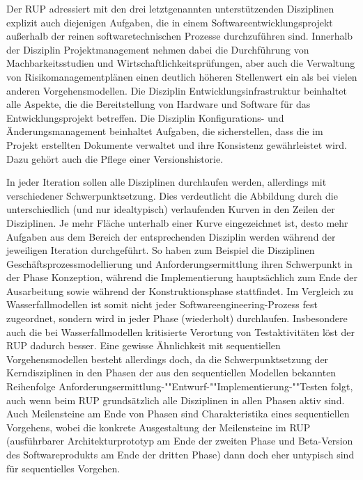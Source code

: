 \vspace{-2mm} %

Der RUP adressiert mit den drei letztgenannten unterstützenden Disziplinen explizit auch diejenigen Aufgaben, die in einem Softwareentwicklungsprojekt außerhalb der reinen softwaretechnischen Prozesse durchzuführen sind. Innerhalb der Disziplin Projektmanagement nehmen dabei die Durchführung von Machbarkeitsstudien und Wirtschaftlichkeitsprüfungen, aber auch die Verwaltung von Risiko\-management\-plänen einen deutlich höheren Stellenwert ein als bei vielen anderen Vorgehensmodellen. Die Disziplin Entwicklungsinfrastruktur beinhaltet alle Aspekte, die die Bereitstellung von Hardware und Software für das Entwicklungsprojekt betreffen. Die Disziplin Konfigurations- und Änderungsmanagement beinhaltet Aufgaben, die sicherstellen, dass die im Projekt erstellten Dokumente verwaltet und ihre Konsistenz gewährleistet wird. Dazu gehört auch die Pflege einer Versionshistorie. 

In jeder Iteration sollen alle Disziplinen durchlaufen werden, allerdings mit verschiedener Schwerpunktsetzung. Dies verdeutlicht die Abbildung durch die unterschiedlich (und nur idealtypisch) verlaufenden Kurven in den Zeilen der Disziplinen. Je mehr Fläche unterhalb einer Kurve eingezeichnet ist, desto mehr Aufgaben aus dem Bereich der entsprechenden Disziplin werden während der jeweiligen Iteration durchgeführt. So haben zum Beispiel die Disziplinen Geschäftsprozessmodellierung und Anforderungsermittlung ihren Schwerpunkt in der Phase Konzeption, während die Implementierung hauptsächlich zum Ende der Ausarbeitung sowie während der Konstruktionsphase stattfindet. Im Vergleich zu Wasserfallmodellen ist somit nicht jeder Softwareengineering-Prozess fest zugeordnet, sondern wird in jeder Phase (wiederholt) durchlaufen. Insbesondere auch die bei Wasserfallmodellen kritisierte Ver\-ortung von Testaktivitäten löst der RUP dadurch besser. Eine gewisse Ähnlichkeit mit sequentiellen Vorgehensmodellen besteht allerdings doch, da die Schwerpunktsetzung der Kerndisziplinen in den Phasen der aus den sequentiellen Modellen bekannten Reihenfolge Anforderungsermittlung-""Entwurf-""Implementierung-""Testen folgt, auch wenn beim RUP grundsätzlich alle Disziplinen in allen Phasen aktiv sind. Auch Meilensteine am Ende von Phasen sind Charakteristika eines sequen\-tiel\-len Vorgehens, wobei die konkrete Ausgestaltung der Meilensteine im RUP (ausführbarer Architekturprototyp am Ende der zweiten Phase und Beta-Version des Softwareprodukts am Ende der dritten Phase) dann doch eher untypisch sind für sequentielles Vorgehen. 

